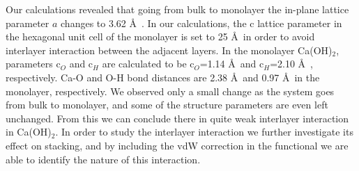 Our calculations revealed that going from bulk to monolayer the in-plane lattice parameter $a$ changes to 3.62 \AA~. In our calculations, the c lattice parameter in the hexagonal unit cell of the monolayer is set to 25 \AA~in order to avoid interlayer interaction between the adjacent layers. In the monolayer Ca(OH)$_2$, parameters c$_O$ and c$_H$ are calculated to be c$_O$=1.14 \AA~and c$_{H}$=2.10 \AA~, respectively. Ca-O and O-H bond distances are 2.38 \AA~and 0.97 \AA~in the monolayer, respectively. We observed only a small change as the system goes from bulk to monolayer, and some of the structure parameters are even left unchanged. From this we can conclude there in quite weak interlayer interaction in Ca(OH)$_2$. In order to study the interlayer interaction we further investigate its effect on stacking, and by including the vdW correction in the functional we are able to identify the nature of this interaction.

